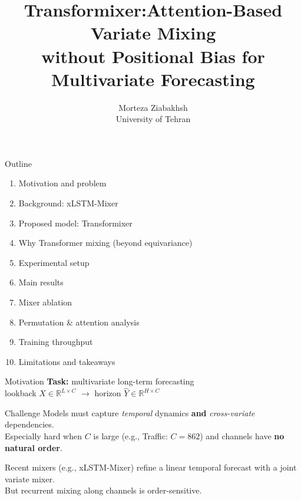 \documentclass[aspectratio=169,11pt]{beamer}
\title{Transformixer:Attention-Based Variate Mixing\\without Positional Bias for Multivariate Forecasting}
\author{Morteza Ziabakhsh\\University of Tehran}
\date{}
\begin{document}
\begin{frame}
  \titlepage
\end{frame}

\begin{frame}{Outline}
  \begin{enumerate}
    \item Motivation and problem
    \item Background: xLSTM-Mixer
    \item Proposed model: Transformixer
    \item Why Transformer mixing (beyond equivariance)
    \item Experimental setup
    \item Main results
    \item Mixer ablation
    \item Permutation \& attention analysis
    \item Training throughput
    \item Limitations and takeaways
  \end{enumerate}
\end{frame}

\begin{frame}{Motivation}
  \textbf{Task:} multivariate long-term forecasting\\
  lookback $X \in \mathbb{R}^{L \times C}$ $\rightarrow$ horizon $\hat Y \in \mathbb{R}^{H \times C}$

  \vspace{0.8em}
  \begin{block}{Challenge}
    Models must capture \emph{temporal} dynamics \textbf{and} \emph{cross-variate} dependencies.\\
    Especially hard when $C$ is large (e.g., Traffic: $C{=}862$) and channels have \textbf{no natural order}.
  \end{block}

  \vspace{0.5em}
  Recent mixers (e.g., xLSTM-Mixer) refine a linear temporal forecast with a joint variate mixer.\\
  \alert{But recurrent mixing along channels is order-sensitive.}
\end{frame}
\end{document}
